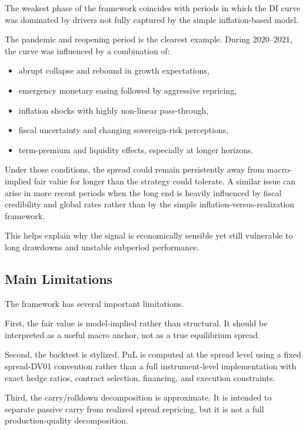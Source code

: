\documentclass[11pt]{article}
\begin{document}
	The weakest phase of the framework coincides with periods in which the DI curve was dominated by drivers not fully captured by the simple inflation-based model.
	
	The pandemic and reopening period is the clearest example. During 2020--2021, the curve was influenced by a combination of:
	\begin{itemize}
		\item abrupt collapse and rebound in growth expectations,
		\item emergency monetary easing followed by aggressive repricing,
		\item inflation shocks with highly non-linear pass-through,
		\item fiscal uncertainty and changing sovereign-risk perceptions,
		\item term-premium and liquidity effects, especially at longer horizons.
	\end{itemize}
	
	Under those conditions, the spread could remain persistently away from macro-implied fair value for longer than the strategy could tolerate. A similar issue can arise in more recent periods when the long end is heavily influenced by fiscal credibility and global rates rather than by the simple inflation-versus-realization framework.
	
	This helps explain why the signal is economically sensible yet still vulnerable to long drawdowns and unstable subperiod performance.
	
	\subsection{Main Limitations}
	\label{subsec:main_limitations}
	
	The framework has several important limitations.
	
	First, the fair value is model-implied rather than structural. It should be interpreted as a useful macro anchor, not as a true equilibrium spread.
	
	Second, the backtest is stylized. PnL is computed at the spread level using a fixed spread-DV01 convention rather than a full instrument-level implementation with exact hedge ratios, contract selection, financing, and execution constraints.
	
	Third, the carry/rolldown decomposition is approximate. It is intended to separate passive carry from realized spread repricing, but it is not a full production-quality decomposition.
	
\end{document}

